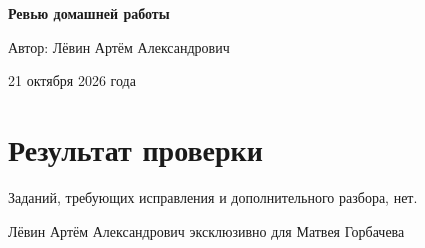 \documentclass[12pt,a4paper]{article}
\begin{document}
\begin{titlepage}
\centering
\vspace*{0.29\textheight}
{\LARGE\bfseries Ревью домашней работы\par}
\vspace{2.2cm}
{\large Автор: Лёвин Артём Александрович\par}
\vspace{0.7cm}
{\large 21 октября 2026 года\par}
\vfill
{}
\end{titlepage}

\newpage
\section*{Результат проверки}
Заданий, требующих исправления и дополнительного разбора, нет.

\vfill
\begin{center}
\small Лёвин Артём Александрович эксклюзивно для Матвея Горбачева
\end{center}
\end{document}
